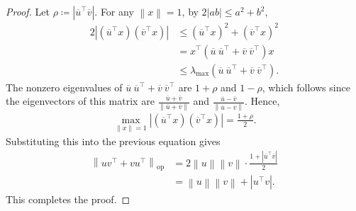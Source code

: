 \documentclass[10pt,a4paper]{amsart}
\newcommand{\Norm}[1]{\left\| #1 \right\|}
\newcommand{\abs}[1]{\left| #1 \right|}
\providecommand{\norm}[1]{\Norm{#1}}
\begin{document}
\begin{proof}
    Let $\rho\coloneq \abs{\overline{u}^{\top}\overline{v}}$. For any
    $\norm{x}=1$, by $2|ab|\leq a^{2}+b^{2}$,
    \begin{align}
        2\abs{
        (\overline{u}^{\top}x)(\overline{v}^{\top}x)
        }
        &\leq
        (\overline{u}^{\top}x)^{2}
        +
        (\overline{v}^{\top}x)^{2} \\
        &=
        x^{\top}
        \left(
        \overline{u}\ \overline{u}^{\top}
        +
        \overline{v}\ \overline{v}^{\top}
        \right)x \\
        &\leq
        \lambda_{\max}
        \left(
        \overline{u}\ \overline{u}^{\top}
        +
        \overline{v}\ \overline{v}^{\top}
        \right).
    \end{align}
    The nonzero eigenvalues of
    $\overline{u}\ \overline{u}^{\top}
    +
    \overline{v}\ \overline{v}^{\top}$
    are $1+\rho$ and $1-\rho$, which follows since the eigenvectors of this matrix are $\frac{\overline{u} + \overline{v}}{\norm{\overline{u} + \overline{v}}}$ and $\frac{\overline{u} - \overline{v}}{\norm{\overline{u} - \overline{v}}}$. Hence,
    \begin{align}
        \max_{\norm{x}=1}
        \abs{
        (\overline{u}^{\top}x)(\overline{v}^{\top}x)
        }
        =
        \frac{1+\rho}{2}.
    \end{align}
    Substituting this into the previous equation gives
    \begin{align}
        \norm{uv^{\top}+vu^{\top}}_{\mathrm{op}}
        &=
        2\norm{u}\norm{v}\cdot
        \frac{1+\abs{\overline{u}^{\top}\overline{v}}}{2} \\
        &=
        \norm{u}\norm{v}
        +
        \abs{u^{\top}v}.
    \end{align}
    This completes the proof.
\end{proof}
\end{document}

